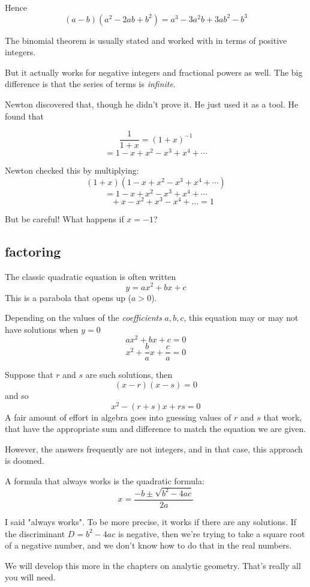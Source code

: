 \documentclass[11pt, oneside]{article}
\begin{document}
Hence
\[ (a-b)(a^2 - 2ab + b^2) = a^3 - 3a^2b + 3ab^2 - b^3 \]

The binomial theorem is usually stated and worked with in terms of positive integers.  

But it actually works for negative integers and fractional powers as well.  The big difference is that the series of terms is \emph{infinite}.

Newton discovered that, though he didn't prove it.  He just used it as a tool.  He found that

\[ \frac{1}{1 + x} = (1+x)^{-1} \]
\[ = 1 - x + x^2 - x^3 + x^4 + \cdots  \]

Newton checked this by multiplying:
\[ (1+x)(1 - x + x^2 - x^3 + x^4 + \cdots) \]
\[ = 1 - x + x^2 - x^3 + x^4 + \cdots \]
\[ \ \ \ \ \ \ \ + x - x^2 + x^3 - x^4 + \dots = 1  \]

But be careful!  What happens if $x = -1$?

\subsection*{factoring}

The classic quadratic equation is often written
\[ y = ax^2 + bx + c \]
This is a parabola that opens up ($a > 0$).  

Depending on the values of the \emph{coefficients} $a,b,c$, this equation may or may not have solutions when $y = 0$
\[ ax^2 + bx + c = 0 \]
\[ x^2 + \frac{b}{a}x + \frac{c}{a} = 0 \]

Suppose that $r$ and $s$ are such solutions, then 
\[ (x - r)(x - s) = 0 \]
and so
\[ x^2 - (r + s)x + rs = 0 \]
A fair amount of effort in algebra goes into guessing values of $r$ and $s$ that work, that have the appropriate sum and difference to match the equation we are given.

However, the answers frequently are not integers, and in that case, this approach is doomed.  

A formula that always works is the quadratic formula:
\[ x = \frac{-b \pm \sqrt{b^2 - 4ac}}{2a} \]

I said "always works".  To be more precise, it works if there are any solutions.  If the discriminant $D = b^2 - 4ac$ is negative, then we're trying to take a square root of a negative number, and we don't know how to do that in the real numbers.

We will develop this more in the chapters on analytic geometry.  That's really all you will need.
\end{document}

